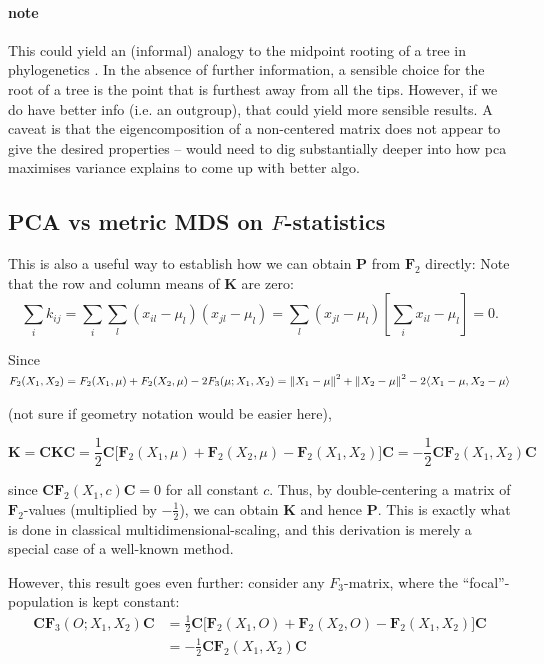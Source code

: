 \documentclass[10pt,a4paper]{article}
\newcommand{\normsq}[1]{\left\lVert#1\right\rVert^2}
\newcommand{\MC}{\mathbf{C}} %
\newcommand{\MF}{\mathbf{F}_2} %
\newcommand{\MFT}{\mathbf{F}_3} %
\newcommand{\MP}{\mathbf{P}} %
\newcommand{\MK}{\mathbf{K}} %
\begin{document}
	\paragraph{note}
	This could yield an (informal) analogy to the midpoint rooting of a tree in phylogenetics \citep[see e.g.][]{felsenstein2004}. In the absence of further information, a sensible choice for the root of a tree is the point that is furthest away from all the tips. However,  if we do have better info (i.e. an outgroup), that could yield more sensible results. A caveat is that the eigencomposition of a non-centered matrix does not appear to give the desired properties -- would need to dig substantially deeper into how pca maximises variance explains to come up with better algo.

\subsection{PCA vs metric MDS on $F$-statistics}	
	
This is also a useful way to establish how we can obtain $\MP$ from $\MF$ directly: Note that the row and column means of $\MK$ are zero:
\begin{equation*}
\sum_i k_{ij}= \sum_i\sum_l (x_{il}-\mu_l)(x_{jl} - \mu_l)= \sum_l(x_{jl} - \mu_l)\left[\sum_i x_{il} -\mu_l\right] = 0 \text{.}
\end{equation*}

Since $F_2(X_1, X_2) = F_2(X_1, \mu) + F_2(X_2, \mu) - 2 F_3(\mu; X_1, X_2) \\= \normsq{X_1-\mu} + \normsq{X_2 - \mu} - 2\langle X_1 - \mu, X_2 - \mu \rangle$

(not sure if geometry notation would be easier here),

\begin{equation}
\MK = \MC\MK\MC = \frac{1}{2}\MC\big[\MF(X_1, \mu) + \MF(X_2, \mu) - \MF(X_1, X_2)\big]\MC=-\frac{1}{2} \MC \MF(X_1, X_2) \MC
\end{equation}

since $\MC\MF(X_1, c)\MC = 0$ for all constant $c$. Thus, by double-centering a matrix of $\MF$-values (multiplied by $-\frac{1}{2}$), we can obtain $\MK$ and hence $\MP$. This is exactly what is done in classical multidimensional-scaling, and this derivation is merely a special case of a well-known method.

However, this result goes even further: consider any $F_3$-matrix, where the ``focal''-population is kept constant:
\begin{align}
\MC\MFT(O; X_1, X_2)\MC &= \frac{1}{2}\MC\big[\MF(X_1, O) + \MF(X_2, O) - \MF(X_1, X_2)\big]\MC\nonumber\\
 &=-\frac{1}{2} \MC \MF(X_1, X_2) \MC 
\end{align}
\end{document}
